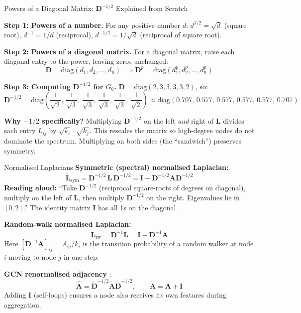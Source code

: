 \begin{mathbox}{Powers of a Diagonal Matrix: $\mathbf{D}^{-1/2}$ Explained from Scratch}

\textbf{Step 1: Powers of a number.}
For any positive number $d$: $d^{1/2} = \sqrt{d}$ (square root), $d^{-1} = 1/d$ (reciprocal), $d^{-1/2} = 1/\sqrt{d}$ (reciprocal of square root).

\textbf{Step 2: Powers of a diagonal matrix.}
For a diagonal matrix, raise each diagonal entry to the power, leaving zeros unchanged:
\[
\mathbf{D} = \mathrm{diag}(d_1, d_2, \ldots, d_n) \implies \mathbf{D}^p = \mathrm{diag}(d_1^p, d_2^p, \ldots, d_n^p)
\]

\textbf{Step 3: Computing $\mathbf{D}^{-1/2}$ for $G_6$.}
$\mathbf{D} = \mathrm{diag}(2, 3, 3, 3, 3, 2)$, so:
\[
\mathbf{D}^{-1/2} = \mathrm{diag}\!\left(\frac{1}{\sqrt{2}},\, \frac{1}{\sqrt{3}},\, \frac{1}{\sqrt{3}},\, \frac{1}{\sqrt{3}},\, \frac{1}{\sqrt{3}},\, \frac{1}{\sqrt{2}}\right)
\approx \mathrm{diag}(0.707,\, 0.577,\, 0.577,\, 0.577,\, 0.577,\, 0.707)
\]

\textbf{Why $-1/2$ specifically?}
Multiplying $\mathbf{D}^{-1/2}$ on the left \emph{and} right of $\mathbf{L}$ divides each entry $L_{ij}$ by $\sqrt{k_i} \cdot \sqrt{k_j}$. This rescales the matrix so high-degree nodes do not dominate the spectrum. Multiplying on both sides (the ``sandwich'') preserves symmetry.
\end{mathbox}

\begin{mathbox}{Normalised Laplacians}
\textbf{Symmetric (spectral) normalised Laplacian:}
\[
\tilde{\mathbf{L}}_{\mathrm{sym}} = \mathbf{D}^{-1/2}\,\mathbf{L}\,\mathbf{D}^{-1/2}
= \mathbf{I} - \mathbf{D}^{-1/2}\mathbf{A}\mathbf{D}^{-1/2}
\]
\textbf{Reading aloud:} ``Take $\mathbf{D}^{-1/2}$ (reciprocal square-roots of degrees on diagonal), multiply on the left of $\mathbf{L}$, then multiply $\mathbf{D}^{-1/2}$ on the right. Eigenvalues lie in $[0,2]$.'' The identity matrix $\mathbf{I}$ has all 1s on the diagonal.

\textbf{Random-walk normalised Laplacian:}
\[
\tilde{\mathbf{L}}_{\mathrm{rw}} = \mathbf{D}^{-1}\mathbf{L} = \mathbf{I} - \mathbf{D}^{-1}\mathbf{A}
\]
Here $[\mathbf{D}^{-1}\mathbf{A}]_{ij} = A_{ij}/k_i$ is the transition probability of a random walker at node $i$ moving to node $j$ in one step.

\textbf{GCN renormalised adjacency} \cite{kipf2017}:
\[
\hat{\mathbf{A}} = \tilde{\mathbf{D}}^{-1/2}\tilde{\mathbf{A}}\tilde{\mathbf{D}}^{-1/2},
\qquad \tilde{\mathbf{A}} = \mathbf{A} + \mathbf{I}
\]
Adding $\mathbf{I}$ (self-loops) ensures a node also receives its own features during aggregation.
\end{mathbox}

